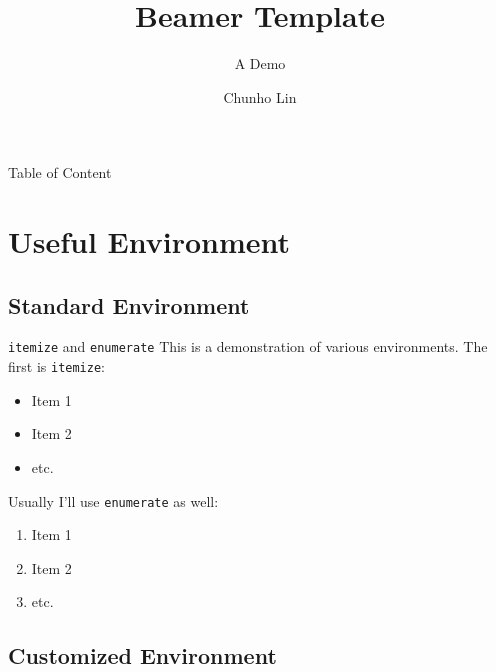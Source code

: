 \documentclass[aspectratio=169]{beamer}
\title[\cite{LinLaTeXTemplate}]{Beamer Template}
\subtitle{A Demo}
\institute[USC]{University of Southern California}
\author{Chunho Lin}
\begin{document}
\begin{frame}
    \titlepage
\end{frame}

\begin{frame}{Table of Content}
    \tableofcontents[hideallsubsections]
\end{frame}


\section{Useful Environment}
\subsection{Standard Environment}
\begin{frame}{\texttt{itemize} and \texttt{enumerate}}
    This is a demonstration of various environments. The first is \texttt{itemize}:

    \begin{itemize}
        \item Item 1
        \item Item 2
        \item etc.
    \end{itemize}

    Usually I'll use \texttt{enumerate} as well:

    \begin{enumerate}
        \item Item 1
        \item Item 2
        \item etc.
    \end{enumerate}
\end{frame}

\subsection{Customized Environment}
\end{document}
